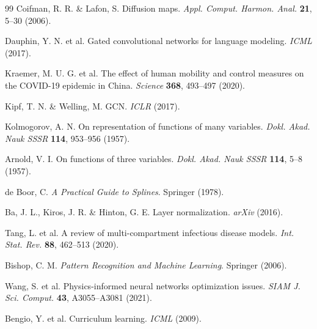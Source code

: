 \documentclass[10pt,letterpaper]{article}
\begin{document}
\begin{thebibliography}{99}
		Coifman, R. R. \& Lafon, S. Diffusion maps.
		\textit{Appl. Comput. Harmon. Anal.} \textbf{21}, 5--30 (2006).
		
		Dauphin, Y. N. et al. Gated convolutional networks for language modeling. 
		\textit{ICML} (2017).
		
		Kraemer, M. U. G. et al. The effect of human mobility and control measures on the COVID-19 epidemic in China. 
		\textit{Science} \textbf{368}, 493–497 (2020).
		
		Kipf, T. N. \& Welling, M. GCN. 
		\textit{ICLR} (2017).
		
		Kolmogorov, A. N. On representation of functions of many variables. 
		\textit{Dokl. Akad. Nauk SSSR} \textbf{114}, 953–956 (1957).
		
		Arnold, V. I. On functions of three variables. 
		\textit{Dokl. Akad. Nauk SSSR} \textbf{114}, 5–8 (1957).
		
		de Boor, C. \textit{A Practical Guide to Splines}. Springer (1978).
		
		Ba, J. L., Kiros, J. R. \& Hinton, G. E. Layer normalization. 
		\textit{arXiv} (2016).
		
		Tang, L. et al. A review of multi-compartment infectious disease models. 
		\textit{Int. Stat. Rev.} \textbf{88}, 462–513 (2020).
		
		Bishop, C. M. \textit{Pattern Recognition and Machine Learning}. Springer (2006).
		
		Wang, S. et al. Physics-informed neural networks optimization issues. 
		\textit{SIAM J. Sci. Comput.} \textbf{43}, A3055–A3081 (2021).
		
		Bengio, Y. et al. Curriculum learning. 
		\textit{ICML} (2009).
		
		
		
	\end{thebibliography}
	
	
	
\end{document}
